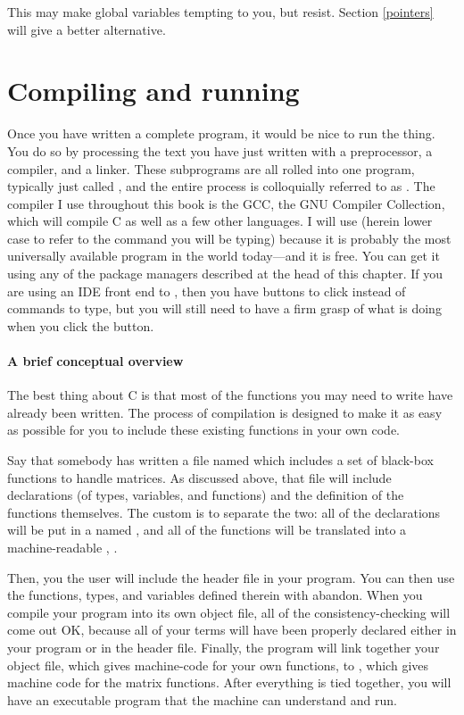 \documentclass[12pt]{article}
\begin{document}
This may make global variables tempting to you, but resist. Section \ref{pointers} will give a better
alternative.

\section{Compiling and running}\label{compilation}  

Once you have written a complete program, it would be nice to run the
thing. You do so by processing the text you have just written with a
preprocessor, a compiler, and a linker. These subprograms are all rolled
into one program, typically just called , and the entire
process is colloquially referred to as . The compiler I use
throughout this book is the GCC, the GNU Compiler Collection, which will
compile C as well as a few other languages. I will use  (herein
lower case to refer to the command you will be typing) because it is probably
the most universally available program in the world today---and it is free.
You can get it using any of the package managers described at the head
of this chapter. If you are using an IDE front end to ,
then you have buttons to click instead of commands to type, but you will
still need to have a firm grasp of what  is doing when you
click the  button.


\paragraph{A brief conceptual overview} The best thing about C is that most
of the functions you may need to write have already been written. The
process of compilation is designed to make it as easy as possible for
you to include these existing functions in your own code.

Say that somebody has written a file named  which
includes a set of black-box functions to handle matrices.
As discussed above,
that file will include declarations (of types, variables, and functions)
and the definition of the functions themselves. The custom is to separate
the two: all of the declarations will be put in a 
named , and all of the functions will be translated
into a machine-readable , .

Then, you the user will include the header file in your program. You can then
use the functions, types, and variables defined therein with abandon.
When you compile your program into its own object file,
all of the consistency-checking will come out OK, because all of your
terms will have been properly declared either in your program or in the
header file. Finally, the program will link together your object file,
which gives machine-code for your own functions, to ,
which gives machine code for the matrix functions. After everything is
tied together, you will have an executable program that the machine can
understand and run.
\end{document}
